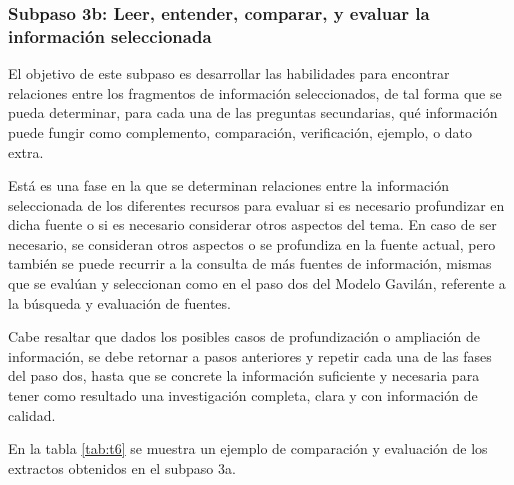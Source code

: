 
\subsubsection{Subpaso 3b: Leer, entender, comparar, y evaluar la información seleccionada}
\label{secPaso3bCap2}

El objetivo de este subpaso es desarrollar las habilidades para encontrar relaciones entre los fragmentos de información seleccionados, de tal forma que se pueda determinar, para cada una de las preguntas secundarias, qué información puede fungir como complemento, comparación, verificación, ejemplo, o dato extra.

Está es una fase en la que se determinan relaciones entre la información seleccionada de los diferentes recursos para evaluar si es necesario profundizar en dicha fuente o si es necesario considerar otros aspectos del tema. En caso de ser necesario, se consideran otros aspectos o se profundiza en la fuente actual, pero también se puede recurrir a la consulta de más fuentes de información, mismas que se evalúan y seleccionan como en el paso dos del Modelo Gavilán, referente a la búsqueda y evaluación de fuentes.

Cabe resaltar que dados los posibles casos de profundización o ampliación de información, se debe retornar a pasos anteriores y repetir cada una de las fases del paso dos, hasta que se concrete la información suficiente y necesaria para tener como resultado una investigación completa, clara y con información de calidad.

En la tabla \ref{tab:t6} se muestra un ejemplo de comparación y evaluación de los extractos obtenidos en el subpaso 3a.

